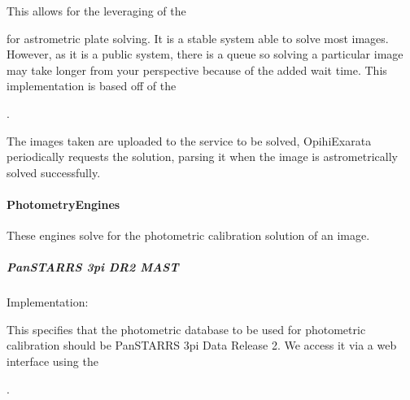 \documentclass[letterpaper,11pt,english]{sphinxmanual}
\begin{document}
\sphinxAtStartPar
This allows for the leveraging of the
%
\begin{footnote}[43]\sphinxAtStartFootnote
{}
%
\end{footnote} for
astrometric plate solving. It is a stable system able to solve most images.
However, as it is a public system, there is a queue so solving a particular
image may take longer from your perspective because of the added wait time.
This implementation is based off of the
%
\begin{footnote}[44]\sphinxAtStartFootnote
{}
%
\end{footnote}.

\sphinxAtStartPar
The images taken are uploaded to the service to be solved, OpihiExarata
periodically requests the solution, parsing it when the image is
astrometrically solved successfully.


\paragraph{PhotometryEngines}
\label{\detokenize{technical/architecture/services_engines:photometryengines}}\label{\detokenize{technical/architecture/services_engines:technical-architecture-services-engines-photometryengines}}
\sphinxAtStartPar
These engines solve for the photometric calibration solution of an image.


\subparagraph{Pan\sphinxhyphen{}STARRS 3pi DR2 MAST}
\label{\detokenize{technical/architecture/services_engines:pan-starrs-3pi-dr2-mast}}
\sphinxAtStartPar
Implementation: {\hyperref[\detokenize{code/opihiexarata.photometry.panstarrs:opihiexarata.photometry.panstarrs.PanstarrsMastWebAPIEngine}]{}}

\sphinxAtStartPar
This specifies that the photometric database to be used for photometric
calibration should be Pan\sphinxhyphen{}STARRS 3pi Data Release 2. We access it via a web
interface using the
%
\begin{footnote}[45]\sphinxAtStartFootnote
{}
%
\end{footnote}.
\end{document}
